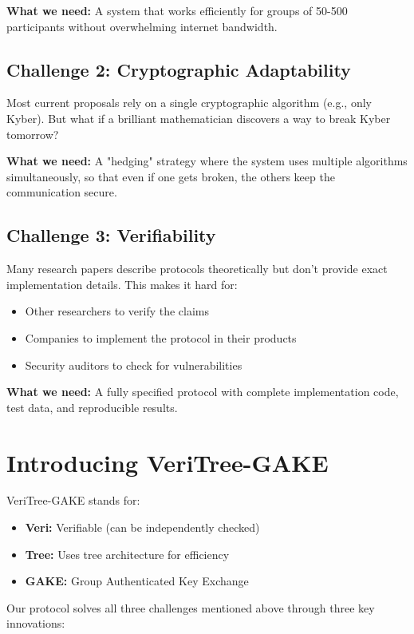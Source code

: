 \documentclass[12pt,a4paper]{report}
\begin{document}
\textbf{What we need:} A system that works efficiently for groups of 50-500 participants without overwhelming internet bandwidth.

\subsection{Challenge 2: Cryptographic Adaptability}

Most current proposals rely on a single cryptographic algorithm (e.g., only Kyber). But what if a brilliant mathematician discovers a way to break Kyber tomorrow?

\textbf{What we need:} A "hedging" strategy where the system uses multiple algorithms simultaneously, so that even if one gets broken, the others keep the communication secure.

\subsection{Challenge 3: Verifiability}

Many research papers describe protocols theoretically but don't provide exact implementation details. This makes it hard for:
\begin{itemize}
\item Other researchers to verify the claims
\item Companies to implement the protocol in their products
\item Security auditors to check for vulnerabilities
\end{itemize}

\textbf{What we need:} A fully specified protocol with complete implementation code, test data, and reproducible results.

\section{Introducing VeriTree-GAKE}

VeriTree-GAKE stands for:
\begin{itemize}
\item \textbf{Veri:} Verifiable (can be independently checked)
\item \textbf{Tree:} Uses tree architecture for efficiency
\item \textbf{GAKE:} Group Authenticated Key Exchange
\end{itemize}

Our protocol solves all three challenges mentioned above through three key innovations:
\end{document}
